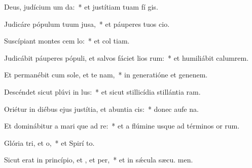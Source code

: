 \item Deus, judícium um  da:~* et justítiam tuam fí gis.
\item Judicáre pópulum tuum  jusa,~* et páuperes tuos  cio.
\item Suscípiant montes cem lo:~* et col tiam.
\item Judicábit páuperes pópuli, et salvos fáciet lios rum:~* et humiliábit calumrem.
\item Et permanébit cum sole, et te nam,~* in generatióne et genenem.
\item Descéndet sicut plúvi in lus:~* et sicut stillicídia stillántia  ram.
\item Oriétur in diébus ejus justítia, et abuntia cis:~* donec aufe na.
\item Et dominábitur a mari que ad re:~* et a flúmine usque ad términos or rum.
\item Glória tri, et o,~* et Spirí to.
\item Sicut erat in princípio, et , et per,~* et in sǽcula sæcu. men.

